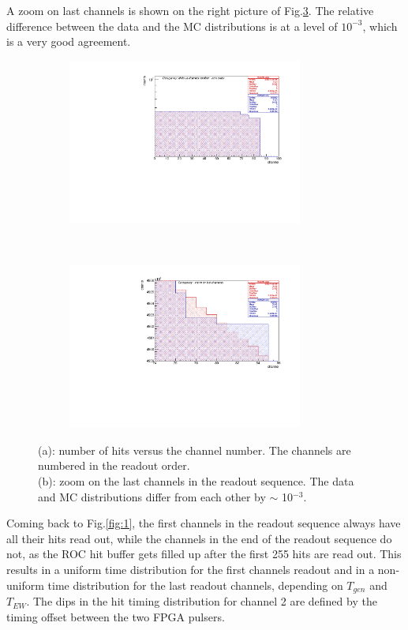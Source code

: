 A zoom on last channels is shown on the right picture of Fig.\ref{fig:2}.
The relative difference between the data and the MC distributions is at a level of $10^{-3}$,
which is a very good agreement.
\begin{figure}[!h]
  \begin{subfigure}[b]{\textwidth}
      \centering
      \includegraphics[width=0.85\textwidth]{figures/pdf/figure_00004_nhitsvschannel_roc_simulation_281.pdf}
      \caption{}
      \label{fig:tt1}
  \end{subfigure}
\\
  \begin{subfigure}[b]{\textwidth}
      \centering
      \includegraphics[width=0.85\textwidth]{figures/pdf/figure_00014_nhitsvschannel_roc_simulation_281.pdf}
      \caption{}
      \label{fig:tt2}
  \end{subfigure}
     \caption{(a): number of hits versus the channel number. The channels are numbered in the readout order.
     \\
     (b): zoom on the last channels in the readout sequence. The data and MC distributions
     differ from each other by $\sim$ 10$^{-3}$.}
     \label{fig:2}
\end{figure}
Coming back to Fig.\ref{fig:1}, the first channels in the readout sequence
always have all their hits read out,
while the channels in the end of the readout sequence do not,
as the ROC hit buffer gets filled up after
the first 255 hits are read out.
This results in a uniform time distribution for the first channels readout and in a non-uniform
time distribution for the last readout channels, depending on $T_{gen}$ and $T_{EW}$.
The dips in the hit timing distribution for channel 2 are defined by the timing offset
between the two FPGA pulsers. 


